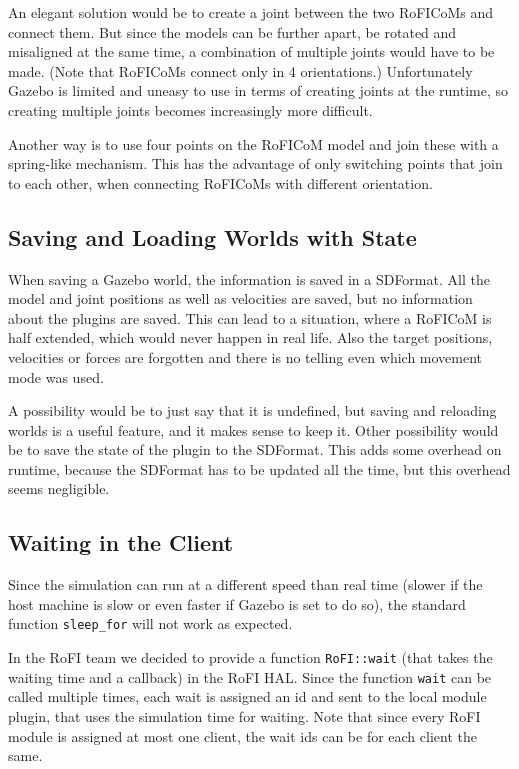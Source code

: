 \documentclass[
  digital, %
  table,   %
  oneside, %
  nolof,     %
  nolot,     %
]{fithesis3}
\newcommand{\code}[1]{\texttt{#1}}
\begin{document}
An elegant solution would be to create a joint between the two RoFICoMs and connect them.
But since the models can be further apart, be rotated and misaligned at the same time, a combination of multiple joints would have to be made.
(Note that RoFICoMs connect only in 4 orientations.)
Unfortunately Gazebo is limited and uneasy to use in terms of creating joints at the runtime, so creating multiple joints becomes increasingly more difficult.

Another way is to use four points on the RoFICoM model and join these with a spring-like mechanism.
This has the advantage of only switching points that join to each other, when connecting RoFICoMs with different orientation.

\subsection{Saving and Loading Worlds with State}

When saving a Gazebo world, the information is saved in a SDFormat.
All the model and joint positions as well as velocities are saved, but no information about the plugins are saved.
This can lead to a situation, where a RoFICoM is half extended, which would never happen in real life.
Also the target positions, velocities or forces are forgotten and there is no telling even which movement mode was used.

A possibility would be to just say that it is undefined, but saving and reloading worlds is a useful feature, and it makes sense to keep it.
Other possibility would be to save the state of the plugin to the SDFormat.
This adds some overhead on runtime, because the SDFormat has to be updated all the time, but this overhead seems negligible.

\subsection{Waiting in the Client}

Since the simulation can run at a different speed than real time (slower if the host machine is slow or even faster if Gazebo is set to do so), the standard function \code{sleep\_for} will not work as expected.

In the RoFI team we decided to provide a function \code{RoFI::wait} (that takes the waiting time and a callback) in the RoFI HAL.
Since the function \code{wait} can be called multiple times, each wait is assigned an id and sent to the local module plugin, that uses the simulation time for waiting.
Note that since every RoFI module is assigned at most one client, the wait ids can be for each client the same.
\end{document}
